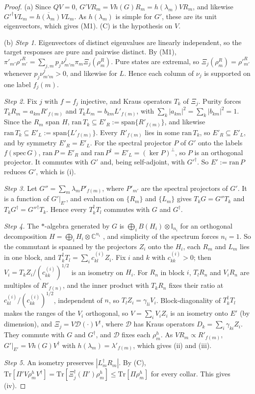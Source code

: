 \documentclass[11pt]{article}
\theoremstyle{definition}
\theoremstyle{remark}
\newcommand{\Tr}{\mathrm{Tr}}
\newcommand{\one}{\mathbb{I}}
\begin{document}
\begin{proof}
(a) Since $QV=0$, $G'VR_m=Vh(G)R_m=h(\lambda_m)VR_m$, and likewise $G'^\dagger VL_m=\overline{h(\lambda_m)}VL_m$. As $h(\lambda_m)$ is simple for $G'$, these are its unit eigenvectors, which gives (M1). (C) is the hypothesis on $V$.

(b) \emph{Step 1.} Eigenvectors of distinct eigenvalues are linearly independent, so the target responses are pure and pairwise distinct. By (M1), $\pi'_{m'}\rho'^R_{m'}=\sum_{j,m}p_j\nu^j_{m'm}\pi_m\Xi_j(\rho^R_m)$. Pure states are extremal, so $\Xi_j(\rho^R_m)=\rho'^R_{m'}$ whenever $p_j\nu^j_{m'm}>0$, and likewise for $L$. Hence each column of $\nu_j$ is supported on one label $f_j(m)$.

\emph{Step 2.} Fix $j$ with $f=f_j$ injective, and Kraus operators $T_k$ of $\Xi_j$. Purity forces $T_kR_m=a_{km}R'_{f(m)}$ and $T_kL_m=b_{km}L'_{f(m)}$, with $\sum_k|a_{km}|^2=\sum_k|b_{km}|^2=1$. Since the $R_m$ span $H$, $\mathrm{ran}\,T_k\subseteq E'_R:=\mathrm{span}\{R'_{f(m)}\}$, and likewise $\mathrm{ran}\,T_k\subseteq E'_L:=\mathrm{span}\{L'_{f(m)}\}$. Every $R'_{f(m)}$ lies in some $\mathrm{ran}\,T_k$, so $E'_R\subseteq E'_L$, and by symmetry $E'_R=E'_L$. For the spectral projector $P$ of $G'$ onto the labels $f(\mathrm{spec}\,G)$, $\mathrm{ran}\,P=E'_R$ and $\mathrm{ran}\,P^\dagger=E'_L=(\ker P)^\perp$, so $P$ is an orthogonal projector. It commutes with $G'$ and, being self-adjoint, with $G'^\dagger$. So $E':=\mathrm{ran}\,P$ reduces $G'$, which is (i).

\emph{Step 3.} Let $G''=\sum_m\lambda_mP'_{f(m)}$, where $P'_{m'}$ are the spectral projectors of $G'$. It is a function of $G'|_{E'}$, and evaluation on $\{R_m\}$ and $\{L_m\}$ gives $T_kG=G''T_k$ and $T_kG^\dagger=G''^\dagger T_k$. Hence every $T_k^\dagger T_l$ commutes with $G$ and $G^\dagger$.

\emph{Step 4.} The $*$-algebra generated by $G$ is $\bigoplus_iB(H_i)\otimes\one_{n_i}$ for an orthogonal decomposition $H=\bigoplus_iH_i\otimes\mathbb C^{n_i}$ \cite{Dav96}, and simplicity of the spectrum forces $n_i=1$. So the commutant is spanned by the projectors $Z_i$ onto the $H_i$, each $R_m$ and $L_m$ lies in one block, and $T_k^\dagger T_l=\sum_ic^{(i)}_{kl}Z_i$. Fix $i$ and $k$ with $c^{(i)}_{kk}>0$; then $V_i=T_kZ_i/(c^{(i)}_{kk})^{1/2}$ is an isometry on $H_i$. For $R_n$ in block $i$, $T_lR_n$ and $V_iR_n$ are multiples of $R'_{f(n)}$, and the inner product with $T_kR_n$ fixes their ratio at $c^{(i)}_{kl}/(c^{(i)}_{kk})^{1/2}$, independent of $n$, so $T_lZ_i=\gamma_{li}V_i$. Block-diagonality of $T_k^\dagger T_l$ makes the ranges of the $V_i$ orthogonal, so $V=\sum_iV_iZ_i$ is an isometry onto $E'$ (by dimension), and $\Xi_j=V\mathcal D(\cdot)V^\dagger$, where $\mathcal D$ has Kraus operators $D_k=\sum_i\gamma_{ki}Z_i$. They commute with $G$ and $G^\dagger$, and $\mathcal D$ fixes each $\rho^h_m$. As $VR_m\propto R'_{f(m)}$, $G'|_{E'}=Vh(G)V^\dagger$ with $h(\lambda_m)=\lambda'_{f(m)}$, which gives (ii) and (iii).

\emph{Step 5.} An isometry preserves $|L_m^\dagger R_m|$. By (C), $\Tr[\Pi'V\rho^h_mV^\dagger]=\Tr[\Xi_j^\dagger(\Pi')\rho^h_m]\le\Tr[\Pi\rho^h_m]$ for every collar. This gives (iv).
\end{proof}
\end{document}
